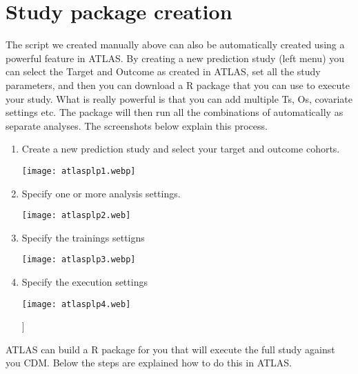 \documentclass[
]{article}
\begin{document}
\newpage

\hypertarget{study-package-creation}{%
\section{Study package creation}\label{study-package-creation}}

The script we created manually above can also be automatically created
using a powerful feature in ATLAS. By creating a new prediction study
(left menu) you can select the Target and Outcome as created in ATLAS,
set all the study parameters, and then you can download a R package that
you can use to execute your study. What is really powerful is that you
can add multiple Ts, Os, covariate settings etc. The package will then
run all the combinations of automatically as separate analyses. The
screenshots below explain this process.

\begin{enumerate}
\def\labelenumi{\arabic{enumi})}
\item
  Create a new prediction study and select your target and outcome
  cohorts.

  \texttt{[image: atlasplp1.webp]}
\item
  Specify one or more analysis settings.

  \texttt{[image: atlasplp2.web]}

  \newpage
\item
  Specify the trainings settigns

  \texttt{[image: atlasplp3.webp]}
\item
  Specify the execution settings

  \texttt{[image: atlasplp4.web]}

  {]} \newpage
\end{enumerate}

ATLAS can build a R package for you that will execute the full study
against you CDM. Below the steps are explained how to do this in ATLAS.
\end{document}

